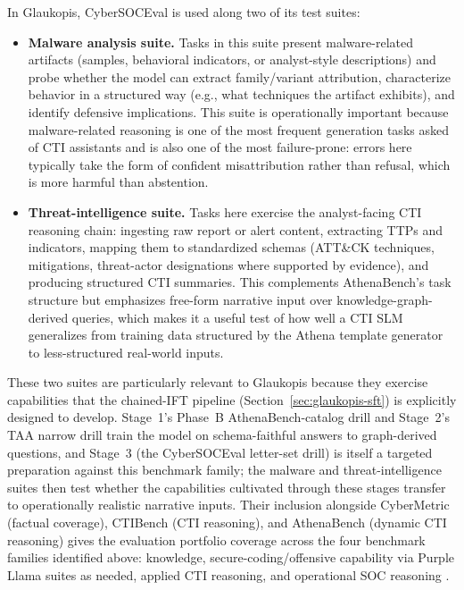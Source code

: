 \documentclass[webpdf,contemporary,large]{oup-authoring-template}
\theoremstyle{thmstyleone}
\theoremstyle{thmstyletwo}
\theoremstyle{thmstylethree}
\begin{document}
In Glaukopis, CyberSOCEval is used along two of its test suites:

\begin{itemize}
  \item \textbf{Malware analysis suite.} Tasks in this suite present malware-related artifacts (samples, behavioral indicators, or analyst-style descriptions) and probe whether the model can extract family/variant attribution, characterize behavior in a structured way (e.g., what techniques the artifact exhibits), and identify defensive implications. This suite is operationally important because malware-related reasoning is one of the most frequent generation tasks asked of CTI assistants and is also one of the most failure-prone: errors here typically take the form of confident misattribution rather than refusal, which is more harmful than abstention.
  \item \textbf{Threat-intelligence suite.} Tasks here exercise the analyst-facing CTI reasoning chain: ingesting raw report or alert content, extracting TTPs and indicators, mapping them to standardized schemas (ATT\&CK techniques, mitigations, threat-actor designations where supported by evidence), and producing structured CTI summaries. This complements AthenaBench's task structure but emphasizes free-form narrative input over knowledge-graph-derived queries, which makes it a useful test of how well a CTI SLM generalizes from training data structured by the Athena template generator to less-structured real-world inputs.
\end{itemize}

These two suites are particularly relevant to Glaukopis because they exercise capabilities that the chained-IFT pipeline (Section~\ref{sec:glaukopis-sft}) is explicitly designed to develop. Stage~1's Phase~B AthenaBench-catalog drill and Stage~2's TAA narrow drill train the model on schema-faithful answers to graph-derived questions, and Stage~3 (the CyberSOCEval letter-set drill) is itself a targeted preparation against this benchmark family; the malware and threat-intelligence suites then test whether the capabilities cultivated through these stages transfer to operationally realistic narrative inputs. Their inclusion alongside CyberMetric (factual coverage), CTIBench (CTI reasoning), and AthenaBench (dynamic CTI reasoning) gives the evaluation portfolio coverage across the four benchmark families identified above: knowledge, secure-coding/offensive capability via Purple Llama suites as needed, applied CTI reasoning, and operational SOC reasoning \cite{tihanyi2024cybermetric,alam2024ctibench,alam2025athenabench,bhatt2023purplellama,bhatt2024cyberseceval2,cybersoceval2025}.
\end{document}
